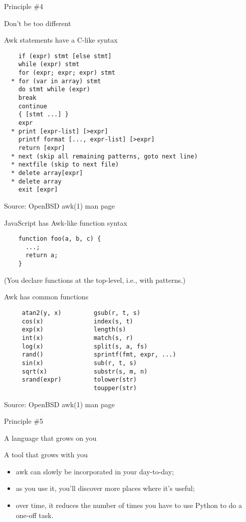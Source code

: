 \documentclass{beamer}
\renewcommand\big[1]{
  \begin{center}
    \Large{#1}
  \end{center}
}
\begin{document}
\begin{frame}
  \centering\Huge{Principle \#4}
  \big{Don't be too different}
\end{frame}

\begin{frame}[fragile]
  \big{Awk statements have a C-like syntax}

  \begin{lstlisting}
    if (expr) stmt [else stmt]
    while (expr) stmt
    for (expr; expr; expr) stmt
  * for (var in array) stmt
    do stmt while (expr)
    break
    continue
    { [stmt ...] }
    expr
  * print [expr-list] [>expr]
    printf format [..., expr-list] [>expr]
    return [expr]
  * next (skip all remaining patterns, goto next line)
  * nextfile (skip to next file)
  * delete array[expr]
  * delete array
    exit [expr]
  \end{lstlisting}
  \scriptsize{Source: OpenBSD awk(1) man page}
\end{frame}

\begin{frame}[fragile]
  \big{JavaScript has Awk-like function syntax}

  \begin{lstlisting}
    function foo(a, b, c) {
      ...;
      return a;
    }
  \end{lstlisting}

  \scriptsize{(You declare functions at the top-level, i.e., with patterns.)}
\end{frame}

\begin{frame}[fragile]
  \big{Awk has common functions}
  \begin{lstlisting}
     atan2(y, x)         gsub(r, t, s)
     cos(x)              index(s, t)
     exp(x)              length(s)
     int(x)              match(s, r)
     log(x)              split(s, a, fs)
     rand()              sprintf(fmt, expr, ...)
     sin(x)              sub(r, t, s)
     sqrt(x)             substr(s, m, n)
     srand(expr)         tolower(str)
                         toupper(str)
  \end{lstlisting}

  \scriptsize{Source: OpenBSD awk(1) man page}
\end{frame}

\begin{frame}
  \centering\Huge{Principle \#5}
  \big{A language that grows on you}
\end{frame}

\begin{frame}
  \big{A tool that grows with you}

  \begin{itemize}
    \item awk can slowly be incorporated in your day-to-day;
    \item as you use it, you'll discover more places where it's useful;
    \item over time, it reduces the number of times you have to use Python to do a one-off task.
  \end{itemize}
\end{frame}
\end{document}
